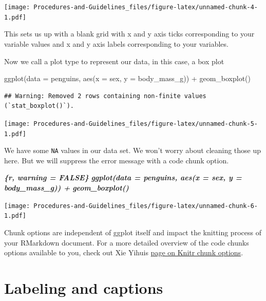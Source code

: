 \documentclass[
]{book}
\newenvironment{Shaded}{\begin{snugshade}}{\end{snugshade}}
\newcommand{\AttributeTok}[1]{\textcolor[rgb]{0.77,0.63,0.00}{#1}}
\newcommand{\FunctionTok}[1]{\textcolor[rgb]{0.00,0.00,0.00}{#1}}
\newcommand{\InformationTok}[1]{\textcolor[rgb]{0.56,0.35,0.01}{\textbf{\textit{#1}}}}
\newcommand{\NormalTok}[1]{#1}
\newcommand{\SpecialCharTok}[1]{\textcolor[rgb]{0.00,0.00,0.00}{#1}}
\begin{document}
\texttt{[image: Procedures-and-Guidelines\_files/figure-latex/unnamed-chunk-4-1.pdf]}

This sets us up with a blank grid with x and y axis ticks corresponding to your variable values and x and y axis labels corresponding to your variables.

Now we call a plot type to represent our data, in this case, a box plot

\begin{Shaded}
\begin{Highlighting}[]
\FunctionTok{ggplot}\NormalTok{(}\AttributeTok{data =}\NormalTok{ penguins, }\FunctionTok{aes}\NormalTok{(}\AttributeTok{x =}\NormalTok{ sex, }\AttributeTok{y =}\NormalTok{ body\_mass\_g)) }\SpecialCharTok{+}
  \FunctionTok{geom\_boxplot}\NormalTok{()}
\end{Highlighting}
\end{Shaded}

\begin{verbatim}
## Warning: Removed 2 rows containing non-finite values (`stat_boxplot()`).
\end{verbatim}

\texttt{[image: Procedures-and-Guidelines\_files/figure-latex/unnamed-chunk-5-1.pdf]}

We have some \texttt{NA} values in our data set. We won't worry about cleaning those up here. But we will suppress the error message with a code chunk option.

\begin{Shaded}
\begin{Highlighting}[]
\InformationTok{\textasciigrave{}\textasciigrave{}\textasciigrave{}\{r, warning = FALSE\}}
\InformationTok{ggplot(data = penguins, aes(x = sex, y = body\_mass\_g)) +}
\InformationTok{  geom\_boxplot()}
\InformationTok{\textasciigrave{}\textasciigrave{}\textasciigrave{}}
\end{Highlighting}
\end{Shaded}

\texttt{[image: Procedures-and-Guidelines\_files/figure-latex/unnamed-chunk-6-1.pdf]}

Chunk options are independent of ggplot itself and impact the knitting process of your RMarkdown document. For a more detailed overview of the code chunks options available to you, check out Xie Yihuis \href{https://yihui.org/knitr/options/}{page on Knitr chunk options}.

\hypertarget{labeling-and-captions}{%
\section{Labeling and captions}\label{labeling-and-captions}}
\end{document}
